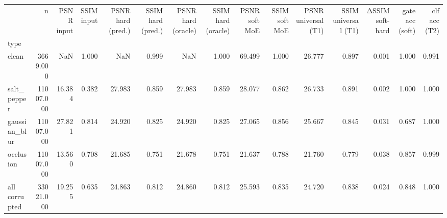 \begin{tabular}{lrrrrrrrrrrrrrr}
\toprule
 & n & PSNR input & SSIM input & PSNR hard (pred.) & SSIM hard (pred.) & PSNR hard (oracle) & SSIM hard (oracle) & PSNR soft MoE & SSIM soft MoE & PSNR universal (T1) & SSIM universal (T1) & ΔSSIM soft-hard & gate acc (soft) & clf acc (T2) \\
type &  &  &  &  &  &  &  &  &  &  &  &  &  &  \\
\midrule
clean & 3669.000 & NaN & 1.000 & NaN & 0.999 & NaN & 1.000 & 69.499 & 1.000 & 26.777 & 0.897 & 0.001 & 1.000 & 0.991 \\
salt_pepper & 11007.000 & 16.384 & 0.382 & 27.983 & 0.859 & 27.983 & 0.859 & 28.077 & 0.862 & 26.733 & 0.891 & 0.002 & 1.000 & 1.000 \\
gaussian_blur & 11007.000 & 27.821 & 0.814 & 24.920 & 0.825 & 24.920 & 0.825 & 27.065 & 0.856 & 25.667 & 0.845 & 0.031 & 0.687 & 1.000 \\
occlusion & 11007.000 & 13.560 & 0.708 & 21.685 & 0.751 & 21.678 & 0.751 & 21.637 & 0.788 & 21.760 & 0.779 & 0.038 & 0.857 & 0.999 \\
all corrupted & 33021.000 & 19.255 & 0.635 & 24.863 & 0.812 & 24.860 & 0.812 & 25.593 & 0.835 & 24.720 & 0.838 & 0.024 & 0.848 & 1.000 \\
\bottomrule
\end{tabular}

